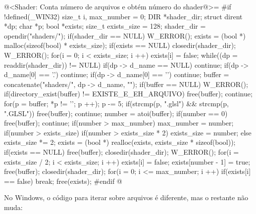 {\iniciocodigo
@<Shader: Conta número de arquivos e obtém número do shader@>=
#if !defined(_WIN32)
{
  size_t i, max_number = 0;
  DIR *shader_dir;
  struct dirent *dp;
  char *p;
  bool *exists;
  size_t exists_size = 128;
  shader_dir = opendir("shaders/");
  if(shader_dir == NULL)
    W_ERROR();
  exists = (bool *) malloc(sizeof(bool) * exists_size);
  if(exists == NULL){
    closedir(shader_dir);
    W_ERROR();
  }
  for(i = 0; i < exists_size; i ++)
    exists[i] = false;
  while((dp = readdir(shader_dir)) != NULL){
    if(dp -> d_name == NULL) continue;
    if(dp -> d_name[0] == '.') continue;
    if(dp -> d_name[0] == '\0') continue;
    buffer = concatenate("shaders/", dp -> d_name, "");
    if(buffer == NULL) W_ERROR();
    if(directory_exist(buffer) != EXISTE_E_EH_ARQUIVO){
      free(buffer);
      continue;
    }
    for(p = buffer; *p != '\0'; p ++);
    p -= 5;
    if(strcmp(p, ".glsl") && strcmp(p, ".GLSL")){
      free(buffer);
      continue;
    }
    number = atoi(buffer);
    if(number == 0){
      free(buffer);
      continue;
    }
    if(number > max_number)
      max_number = number;
    if(number > exists_size){
      if(number > exists_size * 2)
        exists_size = number;
      else
        exists_size *= 2;
      exists = (bool *) realloc(exists, exists_size * sizeof(bool));
      if(exists == NULL){
        free(buffer);
        closedir(shader_dir);
        W_ERROR();
      }
      for(i = exists_size / 2; i < exists_size; i ++)
        exists[i] = false;
    }
    exists[number - 1] = true;
    free(buffer);
  }
  closedir(shader_dir);
  for(i = 0; i <= max_number; i ++)
    if(exists[i] == false){
      break;
    }
  free(exists);
}
#endif
@
\fimcodigo

No Windows, o código para iterar sobre arquivos é diferente, mas o
restante não muda:

}
